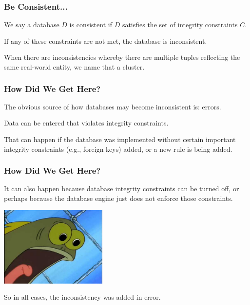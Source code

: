\begin{frame}
\frametitle{Be Consistent...}

We say a database $D$ is \alert{consistent} if $D$ satisfies the set of integrity constraints $C$.

If any of these constraints are not met, the database is \alert{inconsistent}.

When there are inconsistencies whereby there are multiple tuples reflecting the same real-world entity, we name that a \alert{cluster}.


\end{frame}

\begin{frame}
\frametitle{How Did We Get Here?}

The obvious source of how databases may become inconsistent is: errors. 

Data can be entered that violates integrity constraints. 

That can happen if the database was implemented without certain important integrity constraints (e.g., foreign keys) added, or a new rule is being added. 

\end{frame}

\begin{frame}
\frametitle{How Did We Get Here?}

It can also happen because database integrity constraints can be turned off, or perhaps because the database engine just does not enforce those constraints. 

\begin{center}
	\includegraphics[width=0.4\textwidth]{images/youwhat.jpg}
\end{center}

So in all cases, the inconsistency was added in error. 

\end{frame}


